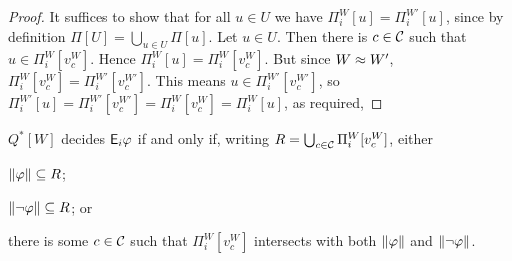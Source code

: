 \begin{proof}
    It suffices to show that for all $u \in U$ we have $\Pi^W_i[u] =
    \Pi^{W'}_i[u]$, since by definition $\Pi[U] = \bigcup_{u \in U}{\Pi[u]}$.
    Let $u \in U$. Then there is $c \in \mathcal{C}$ such that $u \in \Pi^W_i[v^W_c]$.
    Hence $\Pi^W_i[u] = \Pi^W_i[v^W_c]$. But since $W \approx W'$,
    $\Pi^W_i[v^W_c] = \Pi^{W'}_i[v^{W'}_c]$. This means $u \in
    \Pi^{W'}_i[v^{W'}_c]$, so $\Pi^{W'}_i[u] = \Pi^{W'}_i[v^{W'}_c] =
    \Pi^W_i[v^W_c] = \Pi^W_i[u]$, as required,
\end{proof}

\begin{lemma}
    \label{tt_lemma_decide_ephi}
    $Q^*[W]$ decides $\mathsf{E}_i\varphi$ if and only if, writing $R = \bigcup_{c \in
    \mathcal{C}}{\Pi^W_i[v^W_c]}$, either
    \begin{inlinelist}
        \item\label{tt_item_phi_sub_r} $\|{\varphi}\| \subseteq R$;
        \item\label{tt_item_negphi_sub_r} $\|{\neg\varphi}\| \subseteq R$; or
        \item\label{tt_item_r_boundary} there is some $c \in \mathcal{C}$ such that
            $\Pi^W_i[v^W_c]$ intersects with both $\|{\varphi}\|$ and
            $\|{\neg\varphi}\|$.
    \end{inlinelist}
\end{lemma}

